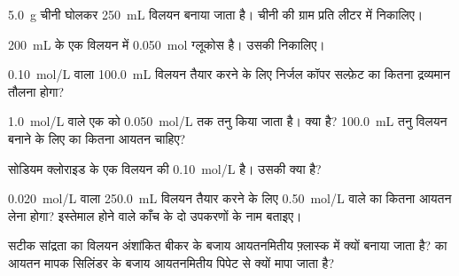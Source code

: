 \begin{exercise}[$\star$]\label{exo:g10:concentration-and-dilution:1}
\qty{5.0}{g} चीनी घोलकर \qty{250}{mL} विलयन बनाया जाता है।
चीनी की  ग्राम प्रति लीटर में निकालिए।
\end{exercise}

\begin{exercise}[$\star$]\label{exo:g10:concentration-and-dilution:2}
\qty{200}{mL} के एक विलयन में \qty{0.050}{mol} ग्लूकोस है।
उसकी  निकालिए।
\end{exercise}

\begin{exercise}[$\star$]\label{exo:g10:concentration-and-dilution:3}
\qty{0.10}{mol/L} वाला \qty{100.0}{mL} विलयन तैयार करने के लिए निर्जल कॉपर सल्फ़ेट
 का कितना द्रव्यमान तौलना होगा?
\end{exercise}

\begin{exercise}[$\star$]\label{exo:g10:concentration-and-dilution:4}
\qty{1.0}{mol/L} वाले एक  को \qty{0.050}{mol/L} तक तनु किया जाता है।
 क्या है? \qty{100.0}{mL} तनु विलयन बनाने के लिए  का
कितना आयतन चाहिए?
\end{exercise}

\begin{exercise}[$\star$]\label{exo:g10:concentration-and-dilution:5}
सोडियम क्लोराइड के एक विलयन की 
\qty{0.10}{mol/L} है। उसकी  क्या है?
\end{exercise}

\begin{exercise}[$\star\star$]\label{exo:g10:concentration-and-dilution:6}
\qty{0.020}{mol/L} वाला \qty{250.0}{mL} विलयन तैयार करने के लिए \qty{0.50}{mol/L}
वाले  का कितना आयतन लेना होगा? इस्तेमाल होने वाले काँच के दो
उपकरणों के नाम बताइए।
\end{exercise}

\begin{exercise}[$\star\star$]\label{exo:g10:concentration-and-dilution:7}
सटीक सांद्रता का विलयन अंशांकित बीकर के बजाय आयतनमितीय फ़्लास्क में क्यों बनाया
जाता है?  का आयतन मापक सिलिंडर के बजाय आयतनमितीय पिपेट से क्यों
मापा जाता है?
\end{exercise}

